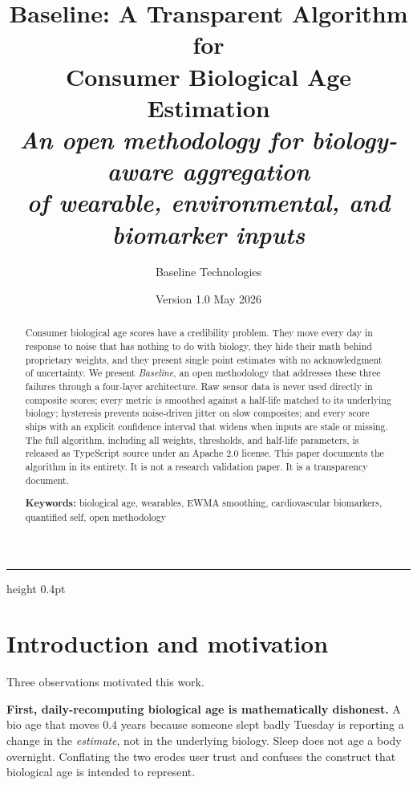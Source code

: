 \documentclass[10pt, a4paper]{article}
\title{
  \vspace{-1.5em}
  \LARGE\bfseries Baseline: A Transparent Algorithm for \\ Consumer Biological Age Estimation \\[0.4em]
  \large\normalfont\itshape An open methodology for biology-aware aggregation \\ of wearable, environmental, and biomarker inputs
}
\author[1]{Baseline Technologies}
\affil[1]{Copenhagen, Denmark \quad \texttt{baseline.ai}}
\date{Version 1.0 \quad\textbullet\quad May 2026}
\begin{document}
\thispagestyle{firstpage}

\maketitle
\vspace{-1.5em}

\begin{abstract}
\noindent
Consumer biological age scores have a credibility problem. They move every day in response to noise that has nothing to do with biology, they hide their math behind proprietary weights, and they present single point estimates with no acknowledgment of uncertainty. We present \emph{Baseline}, an open methodology that addresses these three failures through a four-layer architecture. Raw sensor data is never used directly in composite scores; every metric is smoothed against a half-life matched to its underlying biology; hysteresis prevents noise-driven jitter on slow composites; and every score ships with an explicit confidence interval that widens when inputs are stale or missing. The full algorithm, including all weights, thresholds, and half-life parameters, is released as TypeScript source under an Apache 2.0 license. This paper documents the algorithm in its entirety. It is not a research validation paper. It is a transparency document.

\vspace{0.6em}
\noindent\textbf{Keywords:} biological age, wearables, EWMA smoothing, cardiovascular biomarkers, quantified self, open methodology
\end{abstract}

\vspace{0.5em}
{\color{rule}\hrule height 0.4pt}
\vspace{1em}

\section{Introduction and motivation}

Three observations motivated this work.

\textbf{First, daily-recomputing biological age is mathematically dishonest.} A bio age that moves $0.4$ years because someone slept badly Tuesday is reporting a change in the \emph{estimate}, not in the underlying biology. Sleep does not age a body overnight. Conflating the two erodes user trust and confuses the construct that biological age is intended to represent.
\end{document}
